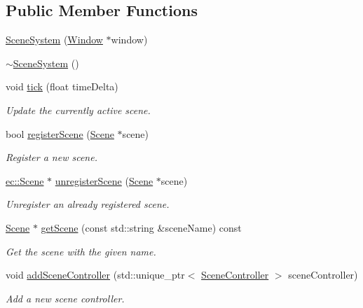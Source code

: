 \subsection*{Public Member Functions}
\begin{DoxyCompactItemize}
\item 
\mbox{\hyperlink{classec_1_1_scene_system_aa5a44baf7e80b2d7d0d96a84847bf2b6}{Scene\+System}} (\mbox{\hyperlink{classec_1_1_window}{Window}} $\ast$window)
\item 
\mbox{\hyperlink{classec_1_1_scene_system_a612e6cc45dbea62c7ffa4c752f965482}{$\sim$\+Scene\+System}} ()
\item 
void \mbox{\hyperlink{classec_1_1_scene_system_a5a858b4c58f53b04d7796e364351b825}{tick}} (float time\+Delta)
\begin{DoxyCompactList}\small\item\em Update the currently active scene. \end{DoxyCompactList}\item 
bool \mbox{\hyperlink{classec_1_1_scene_system_a192ef0c17aaa7893a6b2491ef557cfb6}{register\+Scene}} (\mbox{\hyperlink{classec_1_1_scene}{Scene}} $\ast$scene)
\begin{DoxyCompactList}\small\item\em Register a new scene. \end{DoxyCompactList}\item 
\mbox{\hyperlink{classec_1_1_scene}{ec\+::\+Scene}} $\ast$ \mbox{\hyperlink{classec_1_1_scene_system_ae00450951bc3220dd9899d75bdd207c4}{unregister\+Scene}} (\mbox{\hyperlink{classec_1_1_scene}{Scene}} $\ast$scene)
\begin{DoxyCompactList}\small\item\em Unregister an already registered scene. \end{DoxyCompactList}\item 
\mbox{\hyperlink{classec_1_1_scene}{Scene}} $\ast$ \mbox{\hyperlink{classec_1_1_scene_system_a25b2df199ddab1abc0e2e3f2c87bb690}{get\+Scene}} (const std\+::string \&scene\+Name) const
\begin{DoxyCompactList}\small\item\em Get the scene with the given name. \end{DoxyCompactList}\item 
void \mbox{\hyperlink{classec_1_1_scene_system_a6f59921ccb0a64ead95efc6ef34ffac1}{add\+Scene\+Controller}} (std\+::unique\+\_\+ptr$<$ \mbox{\hyperlink{classec_1_1_scene_controller}{Scene\+Controller}} $>$ scene\+Controller)
\begin{DoxyCompactList}\small\item\em Add a new scene controller. \end{DoxyCompactList}\item 

\end{DoxyCompactItemize}
